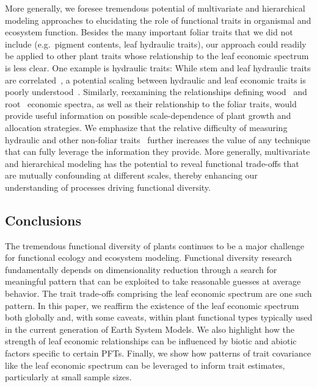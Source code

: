 More generally, we foresee tremendous potential of multivariate and hierarchical modeling approaches to elucidating the role of functional traits in organismal and ecosystem function. 
Besides the many important foliar traits that we did not include (e.g.\ pigment contents, leaf hydraulic traits), our approach could readily be applied to other plant traits whose relationship to the leaf economic spectrum is less clear. 
One example is hydraulic traits:
While stem and leaf hydraulic traits are correlated~\cite{bartlett_hydraulic}, a potential scaling between hydraulic and leaf economic traits is poorly understood~\cite{reich_world-wide_2014,li_leaf_2015}. 
Similarly, reexamining the relationships defining wood~\cite{chave_woodeconomics,baraloto_decoupled_2010,fortunel_leaf_2012} and root~\cite{kramer-walter_root_2016,valverde-barrantes_root_2016} economic spectra, as well as their relationship to the foliar traits, would provide useful information on possible scale-dependence of plant growth and allocation strategies.
We emphasize that the relative difficulty of measuring hydraulic and other non-foliar traits~\cite[e.g.][]{jansen_hydraulic_traits} further increases the value of any technique that can fully leverage the information they provide. 
More generally, multivariate and hierarchical modeling has the potential to reveal functional trade-offs that are mutually confounding at different scales, thereby enhancing our understanding of processes driving functional diversity.

\subsection{Conclusions}

The tremendous functional diversity of plants continues to be a major challenge for functional ecology and ecosystem modeling.
Functional diversity research fundamentally depends on dimensionality reduction through a search for meaningful pattern that can be exploited to take reasonable guesses at average behavior. 
The trait trade-offs comprising the leaf economic spectrum are one such pattern. 
In this paper, we reaffirm the existence of the leaf economic spectrum both globally and, with some caveats, within plant functional types typically used in the current generation of Earth System Models.
We also highlight how the strength of leaf economic relationships can be influenced by biotic and abiotic factors specific to certain PFTs.
Finally, we show how patterns of trait covariance like the leaf economic spectrum can be leveraged to inform trait estimates, particularly at small sample sizes.

